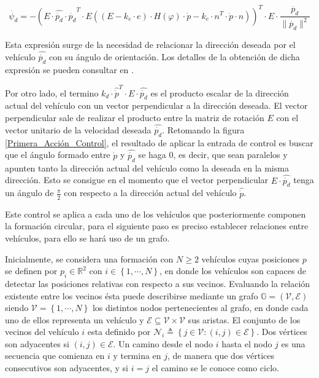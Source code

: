 \begin{equation}\label{Orientacion_deseada}
\dot{\psi_{d}}=-\left(E\cdot\hat{\dot{p_d}}\cdot{\hat{\dot{p_{d}}}^{T}}\cdot{E}\left(\left(E-k_{e}\cdot{e}\right)\cdot{H\left(\varphi\right)}\cdot{\dot{p}}-k_{e}\cdot{n^T}\cdot{\dot{p}}\cdot{n}\right)\right)^{T}\cdot{E}\cdot{\frac{\dot{p_d}}{\|\dot{p_{d}}\|^{2}}}
\end{equation}

Esta expresión surge de la necesidad de relacionar la dirección deseada por el vehículo $\hat{\dot{p_{d}}}$ con su ángulo de orientación. Los detalles de la obtención de dicha expresión se pueden consultar en \cite{Base_Coorporativa}.

Por otro lado, el termino $k_{d}\cdot{\hat{\dot{p}}^{T}}\cdot{E}\cdot{\hat{\dot{p_{d}}}}$ es el producto escalar de la dirección actual del vehículo con un vector perpendicular a la dirección deseada. El vector perpendicular sale de realizar el producto entre la matriz de rotación $E$ con el vector unitario de la velocidad deseada $\hat{\dot{p_{d}}}$.
\newpage
Retomando la figura \ref{Primera_Acción_Control}, el resultado de aplicar la entrada de control es buscar que el ángulo formado entre $\dot{p}$ y $\hat{\dot{p_d}}$ se haga 0, es decir, que sean paralelos y apunten tanto la dirección actual del vehículo como la deseada en la misma dirección. Esto se consigue en el momento que el vector perpendicular ${E}\cdot{\hat{\dot{p_{d}}}}$ tenga un ángulo de $\frac{\pi}{2}$ con respecto a la dirección actual del vehículo $\hat{\dot{p}}$.

Este control se aplica a cada uno de los vehículos que posteriormente componen la formación circular,  para el siguiente paso es preciso establecer relaciones entre vehículos, para ello se hará uso de un grafo.

Inicialmente, se considera una formación con $N\geq{2}$ vehículos cuyas posiciones $p$ se definen por $p_i\in\mathbb{R}^2$ con $i\in\left\lbrace{1,\cdots,N}\right\rbrace$, en donde los vehículos son capaces de detectar las posiciones relativas con respecto a sus vecinos. Evaluando la relación existente entre los vecinos ésta puede describirse mediante un grafo $\mathbb{G}=\left(\mathcal{V},\mathcal{E}\right)$ siendo $\mathcal{V}=\left\lbrace{1,\cdots,N}\right\rbrace$ los distintos nodos pertenecientes al grafo, en donde cada uno de ellos representa un vehículo y $\mathcal{E}\subseteq\mathcal{V}\times\mathcal{V}$ sus aristas. El conjunto de los vecinos del vehículo $i$ esta definido por $\mathcal{N}_i\triangleq\left\lbrace{j\in\mathcal{V}:\left(i,j\right)\in\mathcal{E}}\right\rbrace$. Dos vértices son adyacentes si $\left(i,j\right)\in\mathcal{E}$. Un camino desde el nodo $i$ hasta el nodo $j$ es una secuencia que comienza en $i$ y termina en $j$, de manera que dos vértices consecutivos son adyacentes, y si $i=j$ el camino se le conoce como ciclo. \cite{Control_Formacion}

